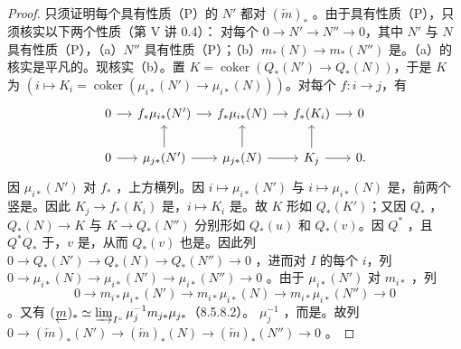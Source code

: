 \begin{proof}
只须证明每个具有性质（P）的 $N'$ 都对 $(\underleftarrow m)_*$ 。由于具有性质（P），只须核实以下两个性质（第 V 讲 0.4）：
对每个 $0\to N'\to N''\to0$，其中 $N'$ 与 $N$ 具有性质（P），（a）$N''$ 具有性质（P）；（b）$m_*(N)\to m_*(N'')$ 是。（a）的核实是平凡的。现核实（b）。置 $K=\operatorname{coker}(Q_*(N')\to Q_*(N))$，于是 $K$ 为 $(i\mapsto K_i=\operatorname{coker}(\mu_{i*}(N')\to\mu_{i*}(N)))$。对每个 $f:i\to j$，有
\[
\begin{tikzcd}[column sep=small]
0\arrow[r]&f_*\mu_{i*}(N')\arrow[r]&f_*\mu_{i*}(N)\arrow[r]&f_*(K_i)\arrow[r]&0\\
0\arrow[r]&\mu_{j*}(N')\arrow[r]\arrow[u]&\mu_{j*}(N)\arrow[r]\arrow[u]&K_j\arrow[r]\arrow[u]&0.
\end{tikzcd}
\]
因 $\mu_{i*}(N')$ 对 $f_*$ ，上方横列。因 $i\mapsto\mu_{i*}(N')$ 与 $i\mapsto\mu_{i*}(N)$ 是，前两个竖是。因此 $K_j\to f_*(K_i)$ 是，$i\mapsto K_i$ 是。故 $K$ 形如 $Q_*(K')$；又因 $Q_*$ ， $Q_*(N)\to K$ 与 $K\to Q_*(N'')$ 分别形如 $Q_*(u)$ 和 $Q_*(v)$。因 $Q^*$ ，且 $Q^*Q_*$ 于，$v$ 是，从而 $Q_*(v)$ 也是。因此列 $0\to Q_*(N')\to Q_*(N)\to Q_*(N'')\to0$ ，进而对 $I$ 的每个 $i$，列 $0\to\mu_{i*}(N)\to\mu_{i*}(N')\to\mu_{i*}(N'')\to0$ 。由于 $\mu_{i*}(N')$ 对 $m_{i*}$ ，列
\[
 0\to m_{i*}\mu_{i*}(N')\to m_{i*}\mu_{i*}(N)\to m_{i*}\mu_{i*}(N'')\to0
\]
。又有 $(\underleftarrow m)_*\simeq\varinjlim_{I^\circ}\mu_j^{-1}m_{j*}\mu_{j*}$（8.5.8.2）。 $\mu_j^{-1}$ ，而是。故列 $0\to(\underleftarrow m)_*(N')\to(\underleftarrow m)_*(N)\to(\underleftarrow m)_*(N'')\to0$ 。
\end{proof}

